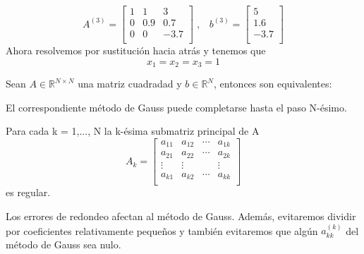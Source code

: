 \begin{nlist}
\begin{ejemplo}
	\[ A^{(3)} =
	\begin{bmatrix}
	1 & 1 & 3 \\
	0 & 0.9 & 0.7 \\
	0 & 0 & -3.7 \\
	\end{bmatrix} \; ,
	\; \; \;
	b^{(3)} =
	\begin{bmatrix}
	5 \\
	1.6 \\
	-3.7 \\
	\end{bmatrix} \] %
	Ahora resolvemos por sustitución hacia atrás y tenemos que
	\[ x_1 = x_2 = x_3 = 1 \]
	\end{ejemplo}

	\begin{nprop}
	Sean $A \in \mathbb{R}^{N \times N}$ una matriz cuadradad y $b \in \mathbb{R}^N$, entonces son equivalentes:
		\begin{nlist}
		\item El correspondiente método de Gauss puede completarse hasta el paso N-ésimo.
		\item Para cada k = 1,..., N la k-ésima submatriz principal de A
		\[ A_k =
		\begin{bmatrix}
		a_{11} & a_{12} & \cdots & a_{1k} \\
		a_{21} & a_{22} & \cdots & a_{2k} \\
		\vdots & \vdots & & \vdots \\
		a_{k1} & a_{k2} & \cdots & a_{kk} \\
		\end{bmatrix} \]
		es regular.
		\end{nlist}
	\end{nprop}

Los errores de redondeo afectan al método de Gauss. Además, evitaremos dividir por coeficientes relativamente pequeños y también evitaremos que algún $a_{kk}^{(k)}$ del método de Gauss sea nulo.


\end{nlist}
